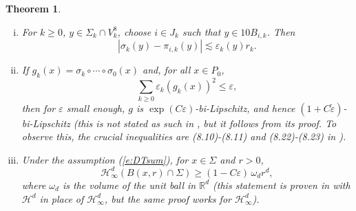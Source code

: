 \documentclass[11pt]{amsart}
\newcommand{\R}{{\mathbb R}}       %
\newcommand{\dist}{{\rm dist}}
\newcommand{\rf}[1]{{(\ref{#1})}}
\newcommand{\ve}{{\varepsilon}}
\newcommand{\wt}[1]{{\widetilde{#1}}}
\newtheorem{theorem}{Theorem}[section]
\theoremstyle{definition}
\theoremstyle{remark}
\numberwithin{equation}{section}
\def\cH{{\mathcal{H}}}
\def\lec{\lesssim}
\def\lec{\lesssim}
\begin{document}
\begin{theorem}
\begin{enumerate}[(i)]
		\item \cite[Lemma 7.2]{DT12} For $k\geq 0$, $y\in \Sigma_{k}\cap V_{k}^{8}$, choose $i\in J_{k}$ such that $y\in 10 B_{i,k}$. Then
		\begin{equation}\label{e:skCloseInBall}
		|\sigma_{k}(y)-\pi_{i,k}(y)|\lec \ve_{k}(y)r_{k}.
		\end{equation} 
%		

\item \cite[Proposition 8.3]{DT12} If $g_{k}(x)= \sigma_{k}\circ\cdots \circ \sigma_{0}(x)$ and, for all $x\in P_{0}$,
		\begin{equation}\label{e:DTsum}
			\sum_{k\geq 0} \ve_{k}(g_{k}(x))^{2}\leq \ve,		
		\end{equation}
	then for $\ve$ small enough, $g$ is $\exp(C\ve)$-bi-Lipschitz, and hence $(1+C\wt\ve)$-bi-Lipschitz (this is not stated as such in \cite[Proposition 8.3]{DT12}, but it follows from its proof. To observe this, the crucial inequalities are  (8.10)-(8.11) and (8.22)-(8.23) in \cite{DT12}).
		\item \cite[Lemma 13.2]{DT12} Under the assumption \rf{e:DTsum}, for $x\in \Sigma$ and $r>0$, 
		\begin{equation}
		\cH^{d}_{\infty}(B(x,r)\cap \Sigma)\geq (1-C\ve)\,\omega_{d} r^{d},
		\label{e:sigmalr}
		\end{equation}
		where $\omega_{d}$ is the volume of the unit ball in $\R^{d}$ (this statement is proven in \cite{DT12} with $\cH^{d}$ in place of $\cH^{d}_{\infty}$, but the same proof works for $\cH^{d}_{\infty}$). 
	\end{enumerate}
	
	
	
	
	\label{t:DT}
\end{theorem}
\end{document}
